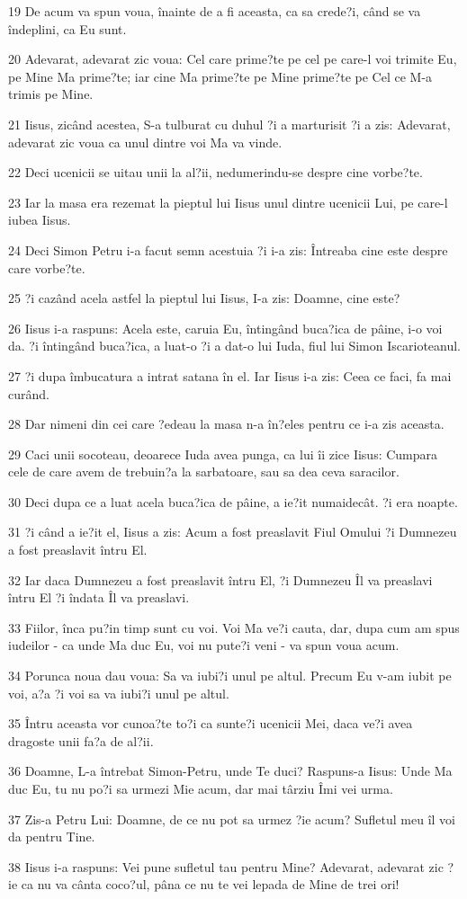 \par 19 De acum va spun voua, înainte de a fi aceasta, ca sa crede?i, când se va îndeplini, ca Eu sunt.
\par 20 Adevarat, adevarat zic voua: Cel care prime?te pe cel pe care-l voi trimite Eu, pe Mine Ma prime?te; iar cine Ma prime?te pe Mine prime?te pe Cel ce M-a trimis pe Mine.
\par 21 Iisus, zicând acestea, S-a tulburat cu duhul ?i a marturisit ?i a zis: Adevarat, adevarat zic voua ca unul dintre voi Ma va vinde.
\par 22 Deci ucenicii se uitau unii la al?ii, nedumerindu-se despre cine vorbe?te.
\par 23 Iar la masa era rezemat la pieptul lui Iisus unul dintre ucenicii Lui, pe care-l iubea Iisus.
\par 24 Deci Simon Petru i-a facut semn acestuia ?i i-a zis: Întreaba cine este despre care vorbe?te.
\par 25 ?i cazând acela astfel la pieptul lui Iisus, I-a zis: Doamne, cine este?
\par 26 Iisus i-a raspuns: Acela este, caruia Eu, întingând buca?ica de pâine, i-o voi da. ?i întingând buca?ica, a luat-o ?i a dat-o lui Iuda, fiul lui Simon Iscarioteanul.
\par 27 ?i dupa îmbucatura a intrat satana în el. Iar Iisus i-a zis: Ceea ce faci, fa mai curând.
\par 28 Dar nimeni din cei care ?edeau la masa n-a în?eles pentru ce i-a zis aceasta.
\par 29 Caci unii socoteau, deoarece Iuda avea punga, ca lui îi zice Iisus: Cumpara cele de care avem de trebuin?a la sarbatoare, sau sa dea ceva saracilor.
\par 30 Deci dupa ce a luat acela buca?ica de pâine, a ie?it numaidecât. ?i era noapte.
\par 31 ?i când a ie?it el, Iisus a zis: Acum a fost preaslavit Fiul Omului ?i Dumnezeu a fost preaslavit întru El.
\par 32 Iar daca Dumnezeu a fost preaslavit întru El, ?i Dumnezeu Îl va preaslavi întru El ?i îndata Îl va preaslavi.
\par 33 Fiilor, înca pu?in timp sunt cu voi. Voi Ma ve?i cauta, dar, dupa cum am spus iudeilor - ca unde Ma duc Eu, voi nu pute?i veni - va spun voua acum.
\par 34 Porunca noua dau voua: Sa va iubi?i unul pe altul. Precum Eu v-am iubit pe voi, a?a ?i voi sa va iubi?i unul pe altul.
\par 35 Întru aceasta vor cunoa?te to?i ca sunte?i ucenicii Mei, daca ve?i avea dragoste unii fa?a de al?ii.
\par 36 Doamne, L-a întrebat Simon-Petru, unde Te duci? Raspuns-a Iisus: Unde Ma duc Eu, tu nu po?i sa urmezi Mie acum, dar mai târziu Îmi vei urma.
\par 37 Zis-a Petru Lui: Doamne, de ce nu pot sa urmez ?ie acum? Sufletul meu îl voi da pentru Tine.
\par 38 Iisus i-a raspuns: Vei pune sufletul tau pentru Mine? Adevarat, adevarat zic ?ie ca nu va cânta coco?ul, pâna ce nu te vei lepada de Mine de trei ori!

